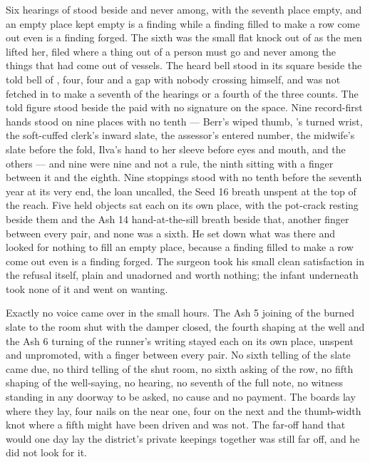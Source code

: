 Six hearings of  stood beside and never among, with the seventh place empty, and an empty place kept empty is a finding while a finding filled to make a row come out even is a finding forged. The sixth was the small flat knock out of  as the men lifted her, filed where a thing out of a person must go and never among the things that had come out of vessels. The heard bell stood in its square beside the told bell of , four, four and a gap with nobody crossing himself, and was not fetched in to make a seventh of the hearings or a fourth of the three counts. The told figure stood beside the paid with no signature on the space. Nine record-first hands stood on nine places with no tenth --- Berr's wiped thumb, 's turned wrist, the soft-cuffed clerk's inward slate, the assessor's entered number, the midwife's slate before the fold, Ilva's hand to her sleeve before eyes and mouth, and the others --- and nine were nine and not a rule, the ninth sitting with a finger between it and the eighth. Nine stoppings stood with no tenth before the seventh year at its very end, the loan uncalled, the Seed 16 breath unspent at the top of the reach. Five held objects sat each on its own place, with the pot-crack resting beside them and the Ash 14 hand-at-the-sill breath beside that, another finger between every pair, and none was a sixth. He set down what was there and looked for nothing to fill an empty place, because a finding filled to make a row come out even is a finding forged. The surgeon took his small clean satisfaction in the refusal itself, plain and unadorned and worth nothing; the infant underneath took none of it and went on wanting.

Exactly no voice came over  in the small hours. The Ash 5 joining of the burned slate to the room shut with the damper closed, the fourth shaping at the well and the Ash 6 turning of the runner's writing stayed each on its own place, unspent and unpromoted, with a finger between every pair. No sixth telling of the slate came due, no third telling of the shut room, no sixth asking of the row, no fifth shaping of the well-saying, no hearing, no seventh of the full note, no witness standing in any doorway to be asked, no cause and no payment. The boards lay where they lay, four nails on the near one, four on the next and the thumb-width knot where a fifth might have been driven and was not. The far-off hand that would one day lay the district's private keepings together was still far off, and he did not look for it.

